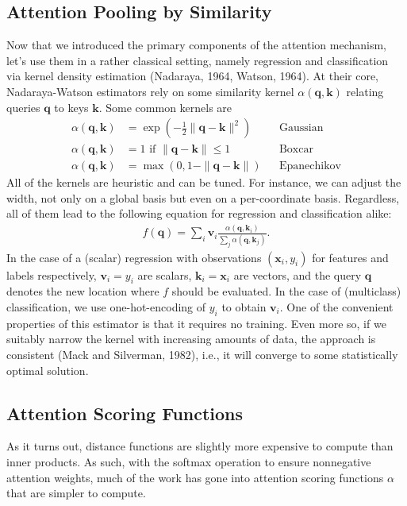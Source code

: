 \documentclass[a4paper,12pt]{article}
\theoremstyle{definition}
\begin{document}
\subsection*{Attention Pooling by Similarity}
Now that we introduced the primary components of the attention mechanism, let’s use them in a rather classical setting, namely regression and classification via kernel density estimation (Nadaraya, 1964, Watson, 1964).
At their core, Nadaraya-Watson estimators rely on some similarity kernel $\alpha(\mathbf{q}, \mathbf{k})$ relating queries $\mathbf{q}$ to keys $\mathbf{k}$. Some common kernels are
\begin{equation*}
    \begin{aligned}
        \alpha(\mathbf{q}, \mathbf{k}) & = \exp\left(-\frac{1}{2} \|\mathbf{q} - \mathbf{k}\|^2 \right) && \mathrm{Gaussian} \\
        \alpha(\mathbf{q}, \mathbf{k}) & = 1 \text{ if } \|\mathbf{q} - \mathbf{k}\| \leq 1 && \mathrm{Boxcar} \\
        \alpha(\mathbf{q}, \mathbf{k}) & = \mathop{\mathrm{max}}\left(0, 1 - \|\mathbf{q} - \mathbf{k}\|\right) && \mathrm{Epanechikov}
    \end{aligned}
\end{equation*}
All of the kernels are heuristic and can be tuned. For instance, we can adjust the width, not only on a global basis but even on a per-coordinate basis. Regardless, all of them lead to the following 
equation for regression and classification alike:
\begin{equation*}
    \begin{aligned}
        f(\mathbf{q}) = \sum_i \mathbf{v}_i \frac{\alpha(\mathbf{q}, \mathbf{k}_i)}{\sum_j \alpha(\mathbf{q}, \mathbf{k}_j)}.
    \end{aligned} 
\end{equation*}
In the case of a (scalar) regression with observations $(\mathbf{x}_i, y_i)$ for features and labels respectively, $\mathbf{v}_i = y_i$ are scalars, $\mathbf{k}_i = \mathbf{x}_i$ are vectors, and 
the query $\mathbf{q}$ denotes the new location where $f$ should be evaluated. In the case of (multiclass) classification, we use one-hot-encoding of $y_i$ to obtain $\mathbf{v}_i$. 
One of the convenient properties of this estimator is that it requires no training. Even more so, if we suitably narrow the kernel with increasing amounts of data, the approach is consistent (Mack and Silverman, 1982),
i.e., it will converge to some statistically optimal solution.
\subsection*{Attention Scoring Functions}
As it turns out, distance functions are slightly more expensive to compute than inner products. As such, with the softmax operation to ensure nonnegative attention weights, 
much of the work has gone into attention scoring functions $\alpha$ that are simpler to compute.
\end{document}
